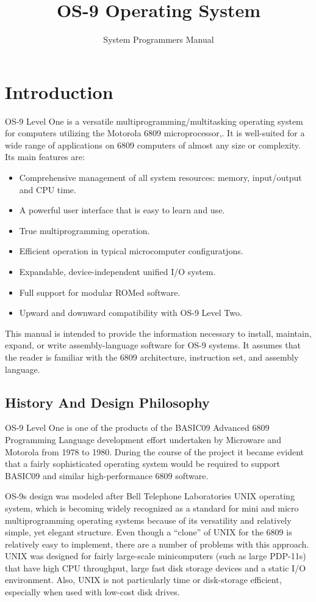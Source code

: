 \documentclass[
]{article}
\title{OS-9 Operating System}
\subtitle{System Programmer\textquotesingle s Manual}
\author{}
\date{}
\begin{document}
\maketitle

\section{Introduction}

OS-9 Level One is a versatile multiprogramming/multitasking operating
system for computers utilizing the Motorola 6809 microprocessor,. It is
well-suited for a wide range of applications on 6809 computers of almost
any size or complexity. Its main features are:

\begin{itemize}
\item
  Comprehensive management of all system resources: memory, input/output
  and CPU time.
\item
  A powerful user interface that is easy to learn and use.
\item
  True multiprogramming operation.
\item
  Efficient operation in typical microcomputer configuratjons.
\item
  Expandable, device-independent unified I/O system.
\item
  Full support for modular ROMed software.
\item
  Upward and downward compatibility with OS-9 Level Two.
\end{itemize}

This manual is intended to provide the information necessary to install,
maintain, expand, or write assembly-language software for OS-9 systems.
It assumes that the reader is familiar with the 6809 architecture,
instruction set, and assembly language.

\subsection{History And Design Philosophy}

OS-9 Level One is one of the products of the BASIC09 Advanced 6809
Programming Language development effort undertaken by Microware and
Motorola from 1978 to 1980. During the course of the project it became
evident that a fairly sophisticated operating system would be required
to support BASIC09 and similar high-performance 6809 software.

OS-9\textquotesingle s design was modeled after Bell Telephone
Laboratories\textquotesingle{} UNIX operating system, which is becoming
widely recognized as a standard for mini and micro multiprogramming
operating systems because of its versatility and relatively simple, yet
elegant structure. Even though a ``clone'' of UNIX for the 6809 is
relatively easy to implement, there are a number of problems with this
approach. UNIX was designed for fairly large-scale minicomputers (such
as large PDP-11s) that have high CPU throughput, large fast disk storage
devices and a static I/O environment. Also, UNIX is not particularly
time or disk-storage efficient, especially when used with low-cost disk
drives.
\end{document}

